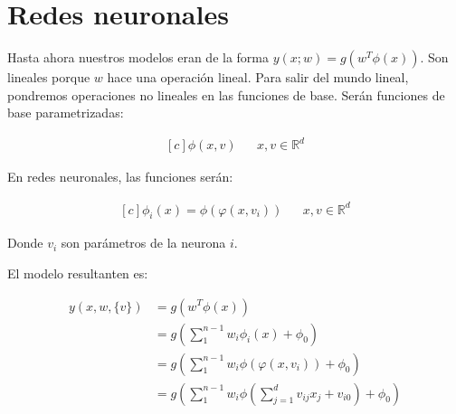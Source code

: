 \section{Redes neuronales}
Hasta ahora nuestros modelos eran de la forma $y(x; w) = g(w^T\phi(x))$. Son lineales porque $w$ hace una operación lineal. Para salir del mundo lineal, pondremos operaciones no lineales en las funciones de base. Serán funciones de base parametrizadas:

\begin{equation*}
\begin{aligned}[c]
    \phi(x,v) && x,v \in \mathbb{R}^d
\end{aligned}
\end{equation*}

En redes neuronales, las funciones serán:

\begin{equation*}
\begin{aligned}[c]
    \phi_i(x) = \phi(\varphi(x, v_i)) && x,v \in \mathbb{R}^d
\end{aligned}
\end{equation*}

Donde $v_i$ son parámetros de la neurona $i$.

El modelo resultanten es:

\begin{align*}
    y(x,w,\{v\}) &= g(w^T\phi(x)) \\
    &= g(\sum_{1}^{n - 1} w_i\phi_i(x) + \phi_0) \\
    &= g(\sum_{1}^{n - 1} w_i\phi(\varphi(x, v_i)) + \phi_0) \\
    &= g(\sum_{1}^{n - 1} w_i\phi(\sum_{j = 1}^{d} v_{ij}x_j + v_{i0}) + \phi_0) \\
\end{align*}
